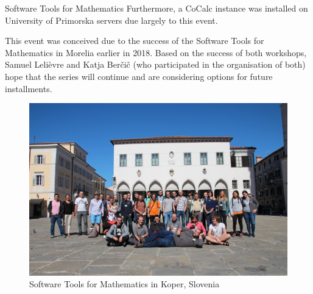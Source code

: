 \begin{event}{Software Tools for Mathematics}
Furthermore, a CoCalc instance was installed on University of Primorska servers
due largely to this event.

This event was conceived due to the success of the Software Tools for Mathematics
in Morelia earlier in 2018.
Based on the success of both workshops,
Samuel Leli\`{e}vre and Katja Ber\v{c}i\v{c} (who participated in the organisation of both)
hope that the series will continue and are considering options for future installments.

\begin{figure}[ht]
  \includegraphics[width=.75\textwidth]{stm-koper2019.jpeg}
  \caption*{Software Tools for Mathematics in Koper, Slovenia}
\end{figure}



\end{event}

